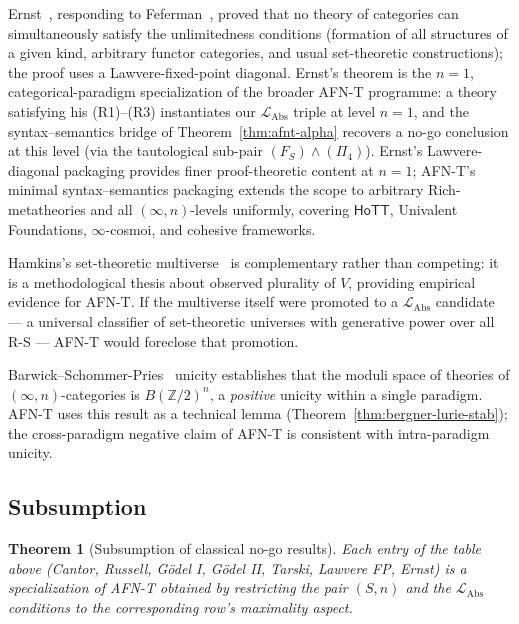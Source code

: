 \documentclass[11pt]{article}
\theoremstyle{plain}
\newtheorem{theorem}{Theorem}[section]
\theoremstyle{definition}
\newcommand{\LAbs}{\mathcal{L}_{\mathrm{Abs}}}
\newcommand{\HoTT}{\mathsf{HoTT}}
\begin{document}
Ernst~\cite{Ernst2015}, responding to Feferman~\cite{Feferman2013}, proved that no theory of categories can simultaneously satisfy the unlimitedness conditions (formation of all structures of a given kind, arbitrary functor categories, and usual set-theoretic constructions); the proof uses a Lawvere-fixed-point diagonal. Ernst's theorem is the $n = 1$, categorical-paradigm specialization of the broader AFN-T programme: a theory satisfying his (R1)--(R3) instantiates our $\LAbs$ triple at level $n = 1$, and the syntax--semantics bridge of Theorem~\ref{thm:afnt-alpha} recovers a no-go conclusion at this level (via the tautological sub-pair $(F_S) \wedge (\Pi_4)$). Ernst's Lawvere-diagonal packaging provides finer proof-theoretic content at $n = 1$; AFN-T's minimal syntax--semantics packaging extends the scope to arbitrary Rich-metatheories and all $(\infty, n)$-levels uniformly, covering $\HoTT$, Univalent Foundations, $\infty$-cosmoi, and cohesive frameworks.

Hamkins's set-theoretic multiverse~\cite{Hamkins2012} is complementary rather than competing: it is a methodological thesis about observed plurality of $V$, providing empirical evidence for AFN-T. If the multiverse itself were promoted to a $\LAbs$ candidate --- a universal classifier of set-theoretic universes with generative power over all R-S --- AFN-T would foreclose that promotion.

Barwick--Schommer-Pries~\cite{BarwickSchommerPries2021} unicity establishes that the moduli space of theories of $(\infty, n)$-categories is $B(\mathbb{Z}/2)^n$, a \emph{positive} unicity within a single paradigm. AFN-T uses this result as a technical lemma (Theorem~\ref{thm:bergner-lurie-stab}); the cross-paradigm negative claim of AFN-T is consistent with intra-paradigm unicity.

\subsection{Subsumption}

\begin{theorem}[Subsumption of classical no-go results]\label{thm:subsumption}
Each entry of the table above (Cantor, Russell, G\"odel I, G\"odel II, Tarski, Lawvere FP, Ernst) is a specialization of AFN-T obtained by restricting the pair $(S, n)$ and the $\LAbs$ conditions to the corresponding row's maximality aspect.
\end{theorem}
\end{document}
